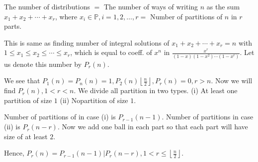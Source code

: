 The number of distributions $=$ The number of ways of writing $n$ as the sum $x_1 + x_2 + \cdots + x_r$,
where $x_i\in\mathbb{P}, i = 1, 2, \ldots, r =$ Number of partitions of $n$ in $r$ parts.

This is same as finding number of integral solutions of $x_1 + x_2 + \cdots + x_r = n$ with $1\leq x_1\leq
x_2\leq \cdots \leq x_r$, which is equal to coeff. of $x^n$ in $\frac{x^r}{(1 - x)(1 - x^2)\cdots(1 -
  x^r)}$. Let us denote this number by $P_r(n)$.

We see that $P_1(n) = P_n(n) = 1, P_2(n) \left\lfloor \frac{n}{2}\right\rfloor, P_r(n) = 0, r > n$. Now we
will find $P_r(n), 1< r < n$. We divide all partition in two types. (i) At least one partition of size $1$
(ii) Nopartition of size $1$.

Number of partitions of in case (i) is $P_{r - 1}(n - 1)$. Number of partitions in case (ii) is $P_r(n -
r)$. Now we add one ball in each part so that each part will have size of at least $2$.

Hence, $P_r(n) = P_{r - 1}(n - 1) | P_r(n - r), 1 < r\leq \left\lfloor \frac{n}{2}\right\rfloor$.

